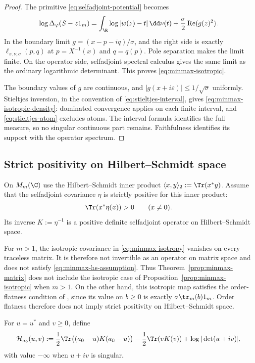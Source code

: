 \begin{proof}
The primitive \eqref{eq:selfadjoint-potential} becomes
\begin{equation}\label{eq:minmax-isotropic-primitive}
 \log\Delta_\varphi(S-z1_m)
 =\int_\R\log|w(z)-t|\,\dd\nu(t)
       +\frac\sigma2\operatorname{Re}(g(z)^2).
\end{equation}
In the boundary limit $g=(x-p-iq)/\sigma$, and the right side is exactly $\ell_{x,\nu,\sigma}(p,q)$ at $p=X^{-1}(x)$ and $q=q(p)$.
Pole separation makes the limit finite.
On the operator side, selfadjoint spectral calculus gives the same limit as the ordinary logarithmic determinant.
This proves \eqref{eq:minmax-isotropic}.

The boundary values of $g$ are continuous, and $|g(x+i\varepsilon)|\le1/\sqrt\sigma$ uniformly.
Stieltjes inversion, in the convention of \eqref{eq:stieltjes-interval}, gives \eqref{eq:minmax-isotropic-density}: dominated convergence applies on each finite interval, and \eqref{eq:stieltjes-atom} excludes atoms.
The interval formula identifies the full measure, so no singular continuous part remains.
Faithfulness identifies its support with the operator spectrum.
\end{proof}

\subsection{Strict positivity on Hilbert--Schmidt space}

On $M_m(\C)$ use the Hilbert--Schmidt inner product $\langle x,y\rangle_2:=\Tr(x^*y)$.
Assume that the selfadjoint covariance $\eta$ is strictly positive for this inner product:
\begin{equation}\label{eq:minmax-hs-assumption}
 \Tr(x^*\eta(x))>0\qquad(x\ne0).
\end{equation}
Its inverse $K:=\eta^{-1}$ is a positive definite selfadjoint operator on Hilbert--Schmidt space.

\begin{remark}\label{rem:minmax-domains}
For $m>1$, the isotropic covariance in \eqref{eq:minmax-isotropy} vanishes on every traceless matrix.
It is therefore not invertible as an operator on matrix space and does not satisfy \eqref{eq:minmax-hs-assumption}.
Thus Theorem~\ref{prop:minmax-matrix} does not include the isotropic case of Proposition~\ref{prop:minmax-isotropic} when $m>1$.
On the other hand, this isotropic map satisfies the order-flatness condition of \cite[Assumption A1]{AEK19}, since its value on $b\ge0$ is exactly $\sigma\tr_m(b)1_m$.
Order flatness therefore does not imply strict positivity on Hilbert--Schmidt space.
\end{remark}
For $u=u^*$ and $v\ge0$, define
\begin{equation}\label{eq:minmax-matrix-action}
 \mathcal H_{a_0}(u,v)
 :=\frac12\Tr\bigl((a_0-u)K(a_0-u)\bigr)
  -\frac12\Tr(vK(v))+\log|\det(u+iv)|,
\end{equation}
with value $-\infty$ when $u+iv$ is singular.

